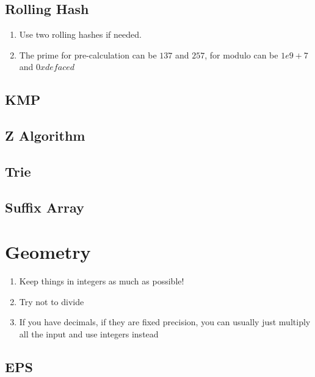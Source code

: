 \documentclass[10pt,oneside]{article}
\begin{document}
\begin{landscape}
\begin{multicols}{2}
\subsection{Rolling Hash}

\begin{enumerate}
	\item Use two rolling hashes if needed.  
	\item The prime for pre-calculation can be $137$ and $257$, for modulo can be $1e9 + 7$ and $0xdefaced$ 
\end{enumerate}



\subsection{KMP}



\subsection{Z Algorithm}

\subsection{Trie}



\subsection{Suffix Array}


\section{Geometry}

\begin{enumerate}
	\item Keep things in integers as much as possible!
	\item Try not to divide
	\item If you have decimals, if they are fixed precision, you can usually just multiply all the input and use integers instead
\end{enumerate}

\subsection{EPS}


\end{multicols}
\end{landscape}
\end{document}
